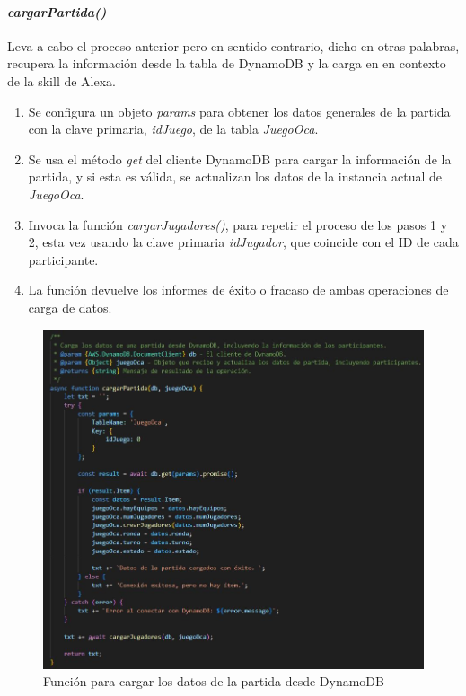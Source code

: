 \paragraph{\textit{cargarPartida()}}

Leva a cabo el proceso anterior pero en sentido contrario, dicho en otras palabras, recupera la información desde la tabla de DynamoDB y la carga en en contexto de la skill de Alexa.
\begin{enumerate}
	\item Se configura un objeto \textit{params} para obtener los datos generales de la partida con la clave primaria, \textit{idJuego}, de la tabla \textit{JuegoOca}. 
	\item Se usa el método \textit{get} del cliente DynamoDB para cargar la información de la partida, y si esta es válida, se actualizan los datos de la instancia actual de \textit{JuegoOca}.
	\item Invoca la función \textit{cargarJugadores()}, para repetir el proceso de los pasos 1 y 2, esta vez usando la clave primaria \textit{idJugador}, que coincide con el ID de cada participante.
	\item La función devuelve los informes de éxito o fracaso de ambas operaciones de carga de datos.
\end{enumerate}

\begin{figure}[H]
	\centering
	\includegraphics{imgs/codigo-db-3.jpg}
	\caption{Función para cargar los datos de la partida desde DynamoDB}
	\label{fig:codigo-db-3}
\end{figure}

